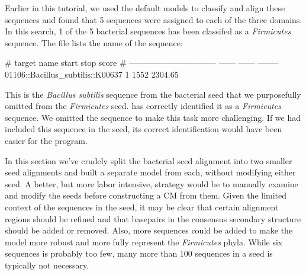 Earlier in this tutorial, we used the default models to classify and
align these sequences and found that 5 sequences were assigned to each of the
three domains. In this search, 1 of the 5 bacterial sequences has been
classifed as a \emph{Firmicutes} sequence. The
 file lists the name of the
sequence:

\begin{sreoutput}
# target name                        start    stop     score
# --------------------------------  ------  ------  --------
  01106::Bacillus_subtilis::K00637       1    1552   2304.65
\end{sreoutput}

This is the \emph{Bacillus subtilis} sequence from the bacterial seed
that we purposefully omitted from the \emph{Firmicutes}
seed.  has correctly identified it as a
\emph{Firmicutes} sequence. 
We omitted the sequence to make this task more challenging.
If we had included this sequence in the seed, its correct
identification would have been easier for the program.

In this section we've crudely split the bacterial seed alignment
into two smaller seed alignments and built a separate model from each,
without modifying either seed. A better, but more labor intensive,
strategy would be to manually examine and modify the seeds before constructing a
CM from them. Given the limited context of the sequences in the seed,
it may be clear that certain alignment regions should be refined and
that basepairs in the consensus secondary structure should be added or
removed. Also, more sequences could be added to make the model more
robust and more fully represent the \emph{Firmicutes} phyla. While six
sequences is probably too few, many more than 100 sequences in a seed
is typically not necessary.



